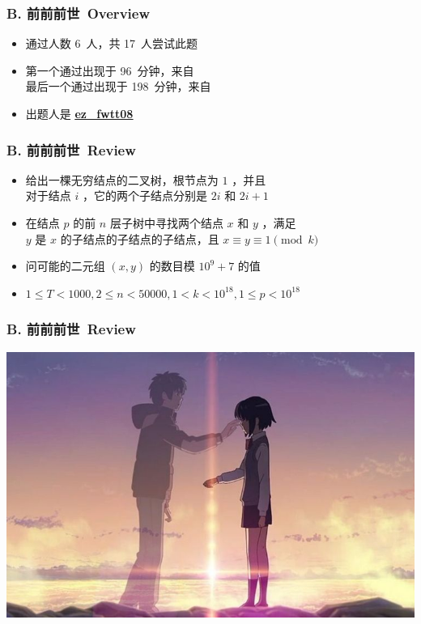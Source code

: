 \documentclass[notheorems]{beamer}
\newcommand{\zhProbB}{前前前世}		\newcommand{\AuthProbB}{\textbf{\underline{\href{http://codeforces.com/profile/EZ_fwtt08}{ez\_fwtt08}}}}
\newcommand{\AccInProbB}{6}	\newcommand{\SubInProbB}{17}	\newcommand{\RatInProbB}{35.29\%}
\newcommand{\FirPenInProbB}{96}		\newcommand{\FirPerInProbB}{\NONE}
\newcommand{\LasPenInProbB}{198}	\newcommand{\LasPerInProbB}{\NONE}
\begin{document}
\begin{frame}[label = ProbB]
\frametitle{B. \zhProbB\ Overview}
\begin{spacing}{2.0} \large
\begin{itemize}[<+->]
\item 通过人数 \AccInProbB\ 人，共 \SubInProbB\ 人尝试此题
\item 第一个通过出现于 \FirPenInProbB\ 分钟，来自 \FirPerInProbB\ 
\\ 最后一个通过出现于 \LasPenInProbB\ 分钟，来自 \LasPerInProbB\ 
\item 出题人是 \AuthProbB\ 
\end{itemize}
\end{spacing}
\end{frame}
\begin{frame}
\frametitle{B. \zhProbB\ Review}
\begin{spacing}{2.0} \large
\begin{itemize}[<+->]
\item 给出一棵无穷结点的二叉树，根节点为 $1$ ，并且 \\ 对于结点 $i$ ，它的两个子结点分别是 $2 i$ 和 $2 i + 1$
\item 在结点 $p$ 的前 $n$ 层子树中寻找两个结点 $x$ 和 $y$ ，满足 \\ $y$ 是 $x$ 的\alert{子结点的子结点的子结点}，且 \alert{$x \equiv y \equiv 1 \pmod{k}$}
\item 问可能的二元组 $(x, y)$ 的数目模 $10^9 + 7$ 的值
\item $1 \leq T < 1000, 2 \leq n < 50000, 1 < k < 10^{18}, 1 \leq p < 10^{18}$
\end{itemize}
\end{spacing}
\end{frame}
\begin{frame}
\frametitle{B. \zhProbB\ Review}
\begin{center}
\includegraphics[scale = 0.6]{B.png}
\end{center}
\end{frame}
\end{document}
